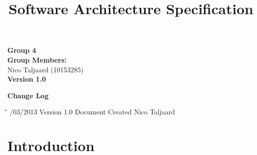 \documentclass[12pt]{article}
\title{Software Architecture Specification}
\begin{document}

\maketitle

\vspace{4em}

\begin{center}%

  \LARGE {\bf Group 4}\\[2em]
  \LARGE {\bf Group Members:}\\[1em]
  \large
      Nico Taljaard			(10153285)	\\[6em]
      
      {\bf Version 1.0}
    
\end{center}%

\newpage

{\LARGE \bf Change Log}\\[2em]

\begin{tabbing}
\hspace*{3cm}\=\hspace*{3cm}\=\hspace*{8cm}\=\hspace*{3cm} /03/2013 \> Version 1.0 \> Document Created \> Nico Taljaard\\

\end{tabbing}

\newpage


\tableofcontents

\newpage


\section{Introduction}
\end{document}
